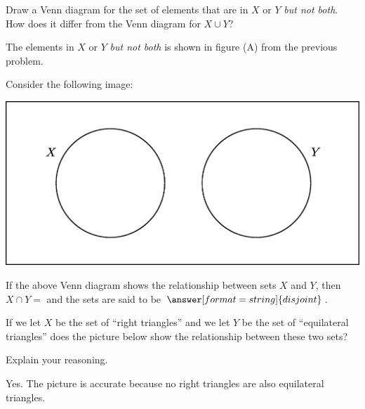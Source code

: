 \documentclass[nooutcomes]{ximera}
\begin{document}
\begin{problem}
Draw a Venn diagram for the set of elements that are in $X$ or $Y$ \emph{but not both}. 
How does it differ from the Venn diagram for $X\cup Y$?  
\begin{freeResponse}
\begin{hint}
The elements in $X$ or $Y$ \emph{but not both} is shown in figure (A) from the previous problem.  
\end{hint}
\end{freeResponse}
\end{problem}

\begin{problem}
Consider the following image: 
\begin{image}
  \includegraphics{set4.png}
\end{image}
If the above Venn diagram shows the relationship between sets $X$ and $Y$, then $X\cap Y =$  and the sets are said to be $\answer[format=string]{disjoint}$.

If we let $X$ be the set of ``right triangles'' and we let $Y$ be the set of ``equilateral triangles'' does the picture below show the relationship between these two sets?
\begin{multipleChoice}
\end{multipleChoice}

Explain your reasoning.
\begin{freeResponse}
\begin{hint}
Yes.  The picture is accurate because no right triangles are also equilateral triangles.  
\end{hint}
\end{freeResponse}
\end{problem}
\end{document}
